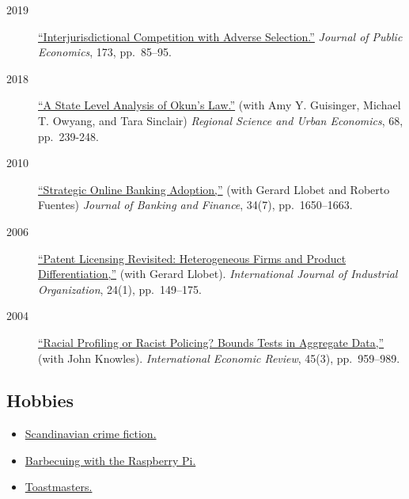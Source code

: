 \documentclass[10pt,]{article}
\def\tightlist{}
\begin{document}
\begin{description}
\tightlist
\item[2019]
\href{https://doi.org/10.1016/j.jpubeco.2019.01.012}{``Interjurisdictional
Competition with Adverse Selection.''} \emph{Journal of Public
Economics}, 173, pp.~85--95.
\item[2018]
\href{https://doi.org/10.1016/j.regsciurbeco.2017.11.005}{``A State
Level Analysis of Okun's Law.''} (with Amy Y. Guisinger, Michael T.
Owyang, and Tara Sinclair) \emph{Regional Science and Urban Economics},
68, pp.~239-248.
\item[2010]
\href{http://dx.doi.org/10.1016/j.jbankfin.2010.03.011}{``Strategic
Online Banking Adoption,''} (with Gerard Llobet and Roberto Fuentes)
\emph{Journal of Banking and Finance}, 34(7), pp.~1650--1663.
\item[2006]
\href{http://dx.doi.org/10.1016/j.ijindorg.2005.03.008}{``Patent
Licensing Revisited: Heterogeneous Firms and Product Differentiation,''}
(with Gerard Llobet). \emph{International Journal of Industrial
Organization}, 24(1), pp.~149--175.
\item[2004]
\href{http://dx.doi.org/10.1111/j.0020-6598.2004.00293.x}{``Racial
Profiling or Racist Policing? Bounds Tests in Aggregate Data,''} (with
John Knowles). \emph{International Economic Review}, 45(3),
pp.~959--989.
\end{description}

\hypertarget{hobbies}{%
\subsection{Hobbies}\label{hobbies}}

\begin{itemize}
\tightlist
\item
  \href{https://en.wikipedia.org/wiki/Scandinavian_noir}{Scandinavian
  crime fiction.}
\item
  \href{https://github.com/CapnBry/HeaterMeter/wiki}{Barbecuing with the
  Raspberry Pi.}
\item
  \href{https://www.toastmasters.org/}{Toastmasters.}
\end{itemize}
\end{document}
